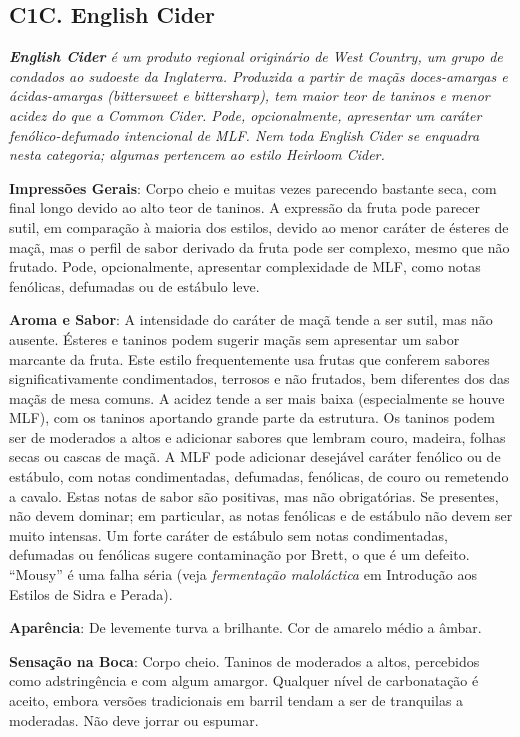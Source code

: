 \subsection*{C1C. English Cider}

\textit{\textbf{English Cider} é um produto regional originário de West Country, um grupo de condados ao sudoeste da Inglaterra. Produzida a partir de maçãs doces-amargas e ácidas-amargas (\textit{bittersweet} e \textit{bittersharp}), tem maior teor de taninos e menor acidez do que a Common Cider. Pode, opcionalmente, apresentar um caráter fenólico-defumado intencional de MLF. Nem toda English Cider se enquadra nesta categoria; algumas pertencem ao estilo Heirloom Cider.}

\textbf{Impressões Gerais}: Corpo cheio e muitas vezes parecendo bastante seca, com final longo devido ao alto teor de taninos. A expressão da fruta pode parecer sutil, em comparação à maioria dos estilos, devido ao menor caráter de ésteres de maçã, mas o perfil de sabor derivado da fruta pode ser complexo, mesmo que não frutado. Pode, opcionalmente, apresentar complexidade de MLF, como notas fenólicas, defumadas ou de estábulo leve.

\textbf{Aroma e Sabor}: A intensidade do caráter de maçã tende a ser sutil, mas não ausente. Ésteres e taninos podem sugerir maçãs sem apresentar um sabor marcante da fruta. Este estilo frequentemente usa frutas que conferem sabores significativamente condimentados, terrosos e não frutados, bem diferentes dos das maçãs de mesa comuns. A acidez tende a ser mais baixa (especialmente se houve MLF), com os taninos aportando grande parte da estrutura. Os taninos podem ser de moderados a altos e adicionar sabores que lembram couro, madeira, folhas secas ou cascas de maçã. A MLF pode adicionar desejável caráter fenólico ou de estábulo, com notas condimentadas, defumadas, fenólicas, de couro ou remetendo a cavalo. Estas notas de sabor são positivas, mas não obrigatórias. Se presentes, não devem dominar; em particular, as notas fenólicas e de estábulo não devem ser muito intensas. Um forte caráter de estábulo sem notas condimentadas, defumadas ou fenólicas sugere contaminação por Brett, o que é um defeito. “Mousy” é uma falha séria (veja \textit{fermentação maloláctica} em Introdução aos Estilos de Sidra e Perada).

\textbf{Aparência}: De levemente turva a brilhante. Cor de amarelo médio a âmbar.

\textbf{Sensação na Boca}: Corpo cheio. Taninos de moderados a altos, percebidos como adstringência e com algum amargor. Qualquer nível de carbonatação é aceito, embora versões tradicionais em barril tendam a ser de tranquilas a moderadas. Não deve jorrar ou espumar.

